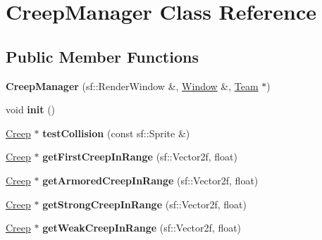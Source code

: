 \hypertarget{class_creep_manager}{\section{Creep\+Manager Class Reference}
\label{class_creep_manager}
}
\subsection*{Public Member Functions}
\begin{DoxyCompactItemize}
\item 
\hypertarget{class_creep_manager_a4f13b9b3ed84c000d68018b35b2bd14a}{{\bfseries Creep\+Manager} (sf\+::\+Render\+Window \&, \hyperlink{class_window}{Window} \&, \hyperlink{class_team}{Team} $\ast$)}\label{class_creep_manager_a4f13b9b3ed84c000d68018b35b2bd14a}

\item 
\hypertarget{class_creep_manager_a30a4f6bc5a2b1c36ec7e2d77cc2e1923}{void {\bfseries init} ()}\label{class_creep_manager_a30a4f6bc5a2b1c36ec7e2d77cc2e1923}

\item 
\hypertarget{class_creep_manager_a35e6299431748bf468fb082bf475ad15}{\hyperlink{class_creep}{Creep} $\ast$ {\bfseries test\+Collision} (const sf\+::\+Sprite \&)}\label{class_creep_manager_a35e6299431748bf468fb082bf475ad15}

\item 
\hypertarget{class_creep_manager_a80db4bddb0cbda7ca275672fa1ec2278}{\hyperlink{class_creep}{Creep} $\ast$ {\bfseries get\+First\+Creep\+In\+Range} (sf\+::\+Vector2f, float)}\label{class_creep_manager_a80db4bddb0cbda7ca275672fa1ec2278}

\item 
\hypertarget{class_creep_manager_ac0258353fb3ff4548c457c3cea1774a9}{\hyperlink{class_creep}{Creep} $\ast$ {\bfseries get\+Armored\+Creep\+In\+Range} (sf\+::\+Vector2f, float)}\label{class_creep_manager_ac0258353fb3ff4548c457c3cea1774a9}

\item 
\hypertarget{class_creep_manager_a5d12a1dd72e3c41b89bcfb45e36c3084}{\hyperlink{class_creep}{Creep} $\ast$ {\bfseries get\+Strong\+Creep\+In\+Range} (sf\+::\+Vector2f, float)}\label{class_creep_manager_a5d12a1dd72e3c41b89bcfb45e36c3084}

\item 
\hypertarget{class_creep_manager_aeefe5a8e8dc14cb821b3994d8f6f092a}{\hyperlink{class_creep}{Creep} $\ast$ {\bfseries get\+Weak\+Creep\+In\+Range} (sf\+::\+Vector2f, float)}\label{class_creep_manager_aeefe5a8e8dc14cb821b3994d8f6f092a}


\end{DoxyCompactItemize}
